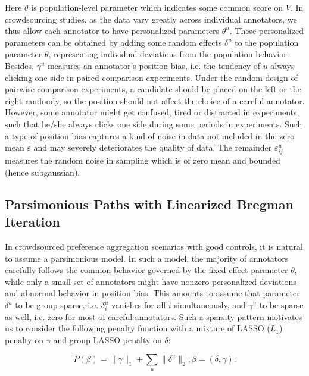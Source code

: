 \documentclass[10pt,journal,cspaper,compsoc]{IEEEtran}
\begin{document}
Here $\theta$ is population-level parameter which indicates some common score on $V$.  In crowdsourcing studies, as the data vary greatly
across individual annotators, we thus allow each annotator to have personalized
parameters $\theta^u$. These personalized parameters can be obtained by adding some
random effects $\delta^u$ to the population parameter $\theta$, representing individual deviations from the population behavior. Besides, $\gamma^u$ measures an annotator's position bias, i.e. the tendency of $u$ always clicking one side in paired comparison experiments. Under the random design of pairwise comparison experiments, a candidate should be placed on the left or the right randomly, so the position should not affect the choice of a careful annotator. However, some annotator might get confused, tired or distracted in experiments, such that he/she always clicks one side during some periods in experiments. Such a type of position bias captures a kind of noise in data not included in the zero mean $\varepsilon$ and may severely deteriorates the quality of data. The remainder $\varepsilon_{ij}^u$ measures the random noise in sampling which is of zero mean and bounded (hence subgaussian).

\subsection{Parsimonious Paths with Linearized Bregman Iteration}

In crowdsourced preference aggregation scenarios with good controls, it is natural to assume a parsimonious model. In such a model, the majority of annotators carefully follows the common behavior governed by the fixed effect parameter $\theta$, while only a small set of annotators might have nonzero personalized deviations and abnormal behavior in position bias. This amounts to assume that parameter $\delta^u$ to be group sparse, i.e. $\delta_i^u$ vanishes for all $i$ simultaneously, and $\gamma^u$ to be sparse as well, i.e. zero for most of careful annotators. Such a sparsity pattern motivates us to consider the following penalty function with a mixture of LASSO ($L_1$) penalty on $\gamma$ and group LASSO penalty on $\delta$:

\begin{equation}\label{eq-penalty}
P(\beta) = \|\gamma\|_1 + \sum_{u}\|\delta^u\|_2, \beta=(\delta,\gamma).
\end{equation}
\end{document}
